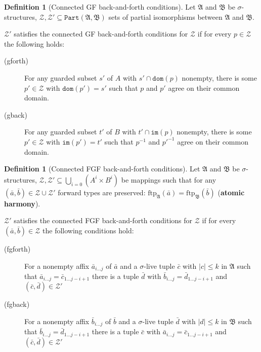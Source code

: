 \documentclass[draft]{scrartcl}
\theoremstyle{definition}
\newtheorem{definition}[theorem]{Definition}
\begin{document}
\begin{definition}[Connected GF back-and-forth conditions]
Let $\mathfrak{A}$ and $\mathfrak{B}$ be $\sigma$-structures, $\mathcal{Z}, \mathcal{Z'} \subseteq \mathtt{Part}(\mathfrak{A}, \mathfrak{B})$ sets of partial isomorphisms between $\mathfrak{A}$ and $\mathfrak{B}$.

$\mathcal{Z'}$ satisfies the connected GF back-and-forth conditions for $\mathcal{Z}$ if for every $p \in \mathcal{Z}$ the following holds:

\begin{description}
    \item[(gforth)] For any guarded subset $s'$ of $A$ with $s' \cap \mathtt{dom}(p)$ nonempty, there is some $p' \in \mathcal{Z}$ with $\mathtt{dom}(p') = s'$ such that $p$ and $p'$ agree on their common domain.
    \item[(gback)] For any guarded subset $t'$ of $B$ with $t' \cap \mathtt{im}(p)$ nonempty, there is some $p' \in \mathcal{Z}$ with $\mathtt{im}(p') = t'$ such that $p^{-1}$ and $p'^{-1}$ agree on their common domain.
\end{description}
\end{definition}

\begin{definition}[Connected FGF back-and-forth conditions]
Let $\mathfrak{A}$ and $\mathfrak{B}$ be $\sigma$-structures, $\mathcal{Z}, \mathcal{Z'} \subseteq \bigcup_{i=0}(A^i \times B^i)$ be mappings such that for any $(\bar{a}, \bar{b}) \in \mathcal{Z} \cup \mathcal{Z'}$ forward types are preserved: $\mathrm{ftp}_\mathfrak{A}(\bar{a}) = \mathrm{ftp}_\mathfrak{B}(\bar{b})$ (\textbf{atomic harmony}).

$\mathcal{Z'}$ satisfies the connected FGF back-and-forth conditions for $\mathcal{Z}$ if for every $(\bar{a}, \bar{b}) \in \mathcal{Z}$ the following conditions hold:

\begin{description}
    \item[(fgforth)] For a nonempty affix $\bar{a}_{i\ldots{}j}$ of $\bar{a}$ and a $\sigma$-live tuple $\bar{c}$ with $|c| \leq k$ in $\mathfrak{A}$ such that $\bar{a}_{i\ldots{}j} = \bar{c}_{1\ldots{}j-i+1}$ there is a tuple $\bar{d}$ with $\bar{b}_{i\ldots{}j} = \bar{d}_{1\ldots{}j-i+1}$ and $(\bar{c}, \bar{d}) \in \mathcal{Z'}$
    \item[(fgback)] For a nonempty affix $\bar{b}_{i\ldots{}j}$ of $\bar{b}$ and a $\sigma$-live tuple $\bar{d}$ with $|d| \leq k$ in $\mathfrak{B}$ such that $\bar{b}_{i\ldots{}j} = \bar{d}_{1\ldots{}j-i+1}$ there is a tuple $\bar{c}$ with $\bar{a}_{i\ldots{}j} = \bar{c}_{1\ldots{}j-i+1}$ and $(\bar{c}, \bar{d}) \in \mathcal{Z'}$
\end{description}
\end{definition}
\end{document}
